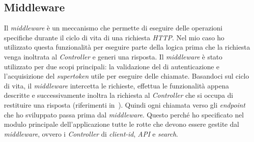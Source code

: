 \subsection{Middleware}\label{subsec:middleware}
Il \textit{middleware} è un meccanismo che permette di eseguire delle operazioni specifiche durante il ciclo di vita di una richiesta \textit{HTTP}. 
Nel mio caso ho utilizzato questa funzionalità per eseguire parte della logica prima che la richiesta venga inoltrata al \textit{Controller} e generi una risposta.
Il \textit{middleware} è stato utilizzato per due scopi principali: la validazione del  di autenticazione e l'acquisizione del \textit{supertoken} utile per eseguire delle chiamate.
Basandoci sul ciclo di vita, il \textit{middleware} intercetta le richieste, effettua le funzionalità appena descritte e successivamente inoltra la richiesta al \textit{Controller} che si occupa di restituire una risposta (riferimenti in~\cite{site:middleware}).
Quindi ogni chiamata verso gli \textit{endpoint} che ho sviluppato passa prima dal \textit{middleware}. Questo perché ho specificato
nel modulo principale dell'applicazione tutte le rotte che devono essere gestite dal \textit{middleware}, ovvero i \textit{Controller} di \textit{client-id}, \textit{API} e \textit{search}.

